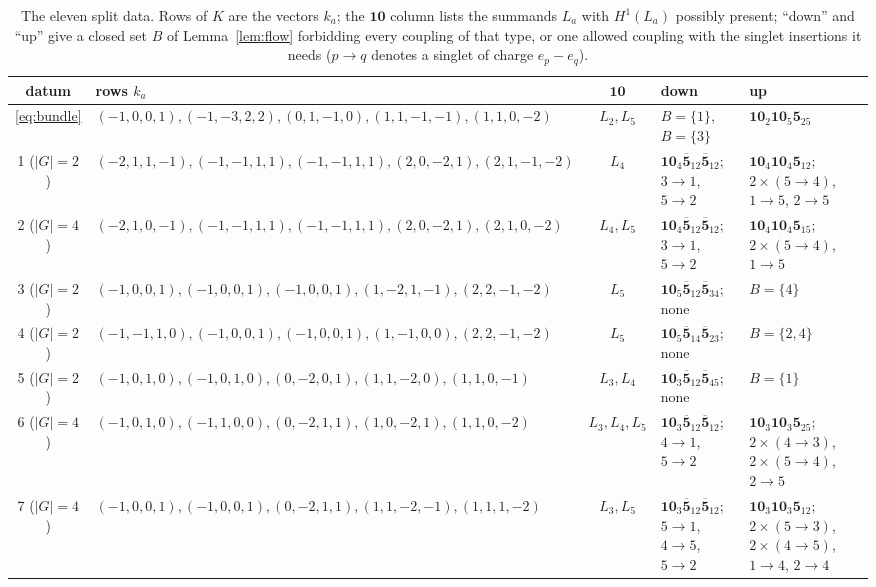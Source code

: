 \begin{table}[t]\small\centering
\caption{The eleven split data. Rows of $K$ are the vectors $k_a$; the
$\mathbf{10}$ column lists the summands $L_a$ with $H^1(L_a)$ possibly
present; ``down'' and ``up'' give a closed set $B$ of Lemma~\ref{lem:flow}
forbidding every coupling of that type, or one allowed coupling with the
singlet insertions it needs ($p\to q$ denotes a singlet of charge
$e_p-e_q$).}\label{tab:eleven}
\begin{adjustbox}{max width=\linewidth}
\begin{tabular}{@{}clcll@{}}
\toprule
datum & rows $k_a$ & $\mathbf{10}$ & down & up\\\midrule
\eqref{eq:bundle} & $(-1,0,0,1),(-1,-3,2,2),(0,1,-1,0),(1,1,-1,-1),(1,1,0,-2)$ & $L_2,L_5$ & $B=\{1\}$, $B=\{3\}$ & $\mathbf{10}_2\mathbf{10}_5\mathbf5_{25}$\\
1 ($|G|=2$) & $(-2,1,1,-1),(-1,-1,1,1),(-1,-1,1,1),(2,0,-2,1),(2,1,-1,-2)$ & $L_4$ & $\mathbf{10}_4\overline{\mathbf5}_{12}\overline{\mathbf5}_{12}$; $3\to1$, $5\to2$ & $\mathbf{10}_4\mathbf{10}_4\mathbf5_{12}$; $2\times(5\to4)$, $1\to5$, $2\to5$\\
2 ($|G|=4$) & $(-2,1,0,-1),(-1,-1,1,1),(-1,-1,1,1),(2,0,-2,1),(2,1,0,-2)$ & $L_4,L_5$ & $\mathbf{10}_4\overline{\mathbf5}_{12}\overline{\mathbf5}_{12}$; $3\to1$, $5\to2$ & $\mathbf{10}_4\mathbf{10}_4\mathbf5_{15}$; $2\times(5\to4)$, $1\to5$\\
3 ($|G|=2$) & $(-1,0,0,1),(-1,0,0,1),(-1,0,0,1),(1,-2,1,-1),(2,2,-1,-2)$ & $L_5$ & $\mathbf{10}_5\overline{\mathbf5}_{12}\overline{\mathbf5}_{34}$; none & $B=\{4\}$\\
4 ($|G|=2$) & $(-1,-1,1,0),(-1,0,0,1),(-1,0,0,1),(1,-1,0,0),(2,2,-1,-2)$ & $L_5$ & $\mathbf{10}_5\overline{\mathbf5}_{14}\overline{\mathbf5}_{23}$; none & $B=\{2,4\}$\\
5 ($|G|=2$) & $(-1,0,1,0),(-1,0,1,0),(0,-2,0,1),(1,1,-2,0),(1,1,0,-1)$ & $L_3,L_4$ & $\mathbf{10}_3\overline{\mathbf5}_{12}\overline{\mathbf5}_{45}$; none & $B=\{1\}$\\
6 ($|G|=4$) & $(-1,0,1,0),(-1,1,0,0),(0,-2,1,1),(1,0,-2,1),(1,1,0,-2)$ & $L_3,L_4,L_5$ & $\mathbf{10}_3\overline{\mathbf5}_{12}\overline{\mathbf5}_{12}$; $4\to1$, $5\to2$ & $\mathbf{10}_3\mathbf{10}_3\mathbf5_{25}$; $2\times(4\to3)$, $2\times(5\to4)$, $2\to5$\\
7 ($|G|=4$) & $(-1,0,0,1),(-1,0,0,1),(0,-2,1,1),(1,1,-2,-1),(1,1,1,-2)$ & $L_3,L_5$ & $\mathbf{10}_3\overline{\mathbf5}_{12}\overline{\mathbf5}_{12}$; $5\to1$, $4\to5$, $5\to2$ & $\mathbf{10}_3\mathbf{10}_3\mathbf5_{12}$; $2\times(5\to3)$, $2\times(4\to5)$, $1\to4$, $2\to4$\\

\end{tabular}
\end{adjustbox}
\end{table}
